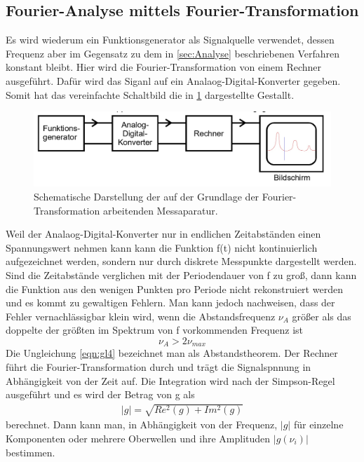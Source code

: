 \subsection{Fourier-Analyse mittels Fourier-Transformation}
\label{sec:Analyse durch Transormation}
Es wird wiederum ein Funktionsgenerator als Signalquelle verwendet, dessen Frequenz aber im Gegensatz zu dem in \ref{sec:Analyse} beschriebenen Verfahren konstant bleibt.
Hier wird die Fourier-Transformation von einem Rechner ausgeführt.
Dafür wird das Siganl auf ein Analaog-Digital-Konverter gegeben.
Somit hat das vereinfachte Schaltbild die in \ref{fig:abb3} dargestellte Gestallt.
\begin{figure}
  \centering
  \includegraphics[width=\textwidth]{abb3.jpg}
  \caption{Schematische Darstellung der auf der Grundlage der Fourier-Transformation arbeitenden Messaparatur.}
  \label{fig:abb3}
\end{figure}
Weil der Analaog-Digital-Konverter nur in endlichen Zeitabständen einen Spannungswert nehmen kann kann die Funktion f(t) nicht kontinuierlich aufgezeichnet werden,
sondern nur durch diskrete Messpunkte dargestellt werden.
Sind die Zeitabstände verglichen mit der Periodendauer von f zu groß, dann kann die Funktion aus den wenigen Punkten pro Periode nicht rekonstruiert werden und es kommt zu gewaltigen Fehlern.
Man kann jedoch nachweisen, dass der Fehler vernachlässigbar klein wird, wenn die Abstandsfrequenz $\nu_A$ größer als das doppelte der größten im Spektrum von f vorkommenden Frequenz ist
\begin{equation}
  \nu_A > 2 \nu_{max}
  \label{eqn:gl4}
\end{equation}
Die Ungleichung \ref{eqn:gl4} bezeichnet man als Abstandstheorem.
Der Rechner führt die Fourier-Transformation durch und trägt die Signalspnnung in Abhängigkeit von der Zeit auf.
Die Integration wird nach der Simpson-Regel ausgeführt und es wird der Betrag von g als
\begin{align}
  |g| = \sqrt{Re^2 (g) + Im^2 (g)}
\end{align}
berechnet.
Dann kann man, in Abhängigkeit von der Frequenz, $|g|$ für einzelne Komponenten oder mehrere Oberwellen und ihre Amplituden $|g(\nu_i)|$ bestimmen.\cite{AnleitungV351}
